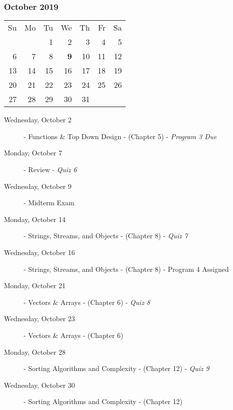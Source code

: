 \subsubsection*{October 2019}
\begin{tabular}{rrrrrrr}
Su & Mo & Tu & We & Th & Fr & Sa\\
   &    &  1 &  2 &  3 &  4 &  5\\
 6 &  7 &  8 & {\bf 9} & 10 & 11 & 12\\
13 & 14 & 15 & 16 & 17 & 18 & 19\\ 
20 & 21 & 22 & 23 & 24 & 25 & 26\\ 
27 & 28 & 29 & 30 & 31 &    &   \\
\end{tabular}
\begin{description}
\item[Wednesday, October 2]
  - Functions \& Top Down Design
  \newline- (Chapter 5)
  \newline- {\em Program 3 Due}

\item[Monday, October 7] 
  - Review
  \newline- {\em Quiz 6}
\item[Wednesday, October 9] 
  - Midterm Exam

\item[Monday, October 14]
  - Strings, Streams, and Objects
  \newline- (Chapter 8)
  \newline- {\em Quiz 7}
\item[Wednesday, October 16]
  - Strings, Streams, and Objects
  \newline- (Chapter 8)
  \newline- Program 4 Assigned

\item[Monday, October 21]
  - Vectors \& Arrays
  \newline- (Chapter 6)
  \newline- {\em Quiz 8}
\item[Wednesday, October 23]
  - Vectors \& Arrays
  \newline- (Chapter 6)

\item[Monday, October 28]
  - Sorting Algorithms and Complexity
  \newline- (Chapter 12)
  \newline- {\em Quiz 9}
\item[Wednesday, October 30]
  - Sorting Algorithms and Complexity
  \newline- (Chapter 12)
\end{description}
\hrulefill


